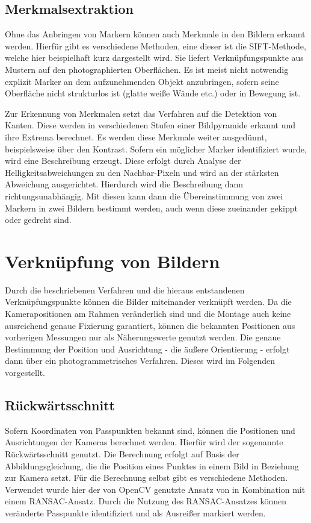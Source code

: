 \documentclass[./00PhotoBox.tex]{subfiles}
\begin{document}
\subsection{Merkmalsextraktion}
Ohne das Anbringen von Markern können auch Merkmale in den Bildern erkannt werden. Hierfür gibt es verschiedene Methoden, eine dieser ist die SIFT-Methode, welche hier beispielhaft kurz dargestellt wird. Sie liefert Verknüpfungspunkte aus Mustern auf den photographierten Oberflächen. Es ist meist nicht notwendig explizit Marker an dem aufzunehmenden Objekt anzubringen, sofern seine Oberfläche nicht strukturlos ist (glatte weiße Wände etc.) oder in Bewegung ist.

Zur Erkennung von Merkmalen setzt das Verfahren auf die Detektion von Kanten. Diese werden in verschiedenen Stufen einer Bildpyramide erkannt und ihre Extrema berechnet. Es werden diese Merkmale weiter ausgedünnt, beispielsweise über den Kontrast. Sofern ein möglicher Marker identifiziert wurde, wird eine Beschreibung erzeugt. Diese erfolgt  durch Analyse der Helligkeitsabweichungen zu den Nachbar-Pixeln und wird an der stärksten Abweichung ausgerichtet. Hierdurch wird die Beschreibung dann richtungsunabhängig. Mit diesen kann dann die Übereinstimmung von zwei Markern in zwei Bildern bestimmt werden, auch wenn diese zueinander gekippt oder gedreht sind.
\citep[S. 484f]{luhmann}

\section{Verknüpfung von Bildern}
\label{s:photogramm}
Durch die beschriebenen Verfahren und die hieraus entstandenen Verknüpfungs\-punkte können die Bilder miteinander verknüpft werden. Da die Kamerapositionen am Rahmen veränderlich sind und die Montage auch keine ausreichend genaue Fixierung garantiert, können die bekannten Positionen aus vorherigen Messungen nur als Näherungswerte genutzt werden. Die genaue Bestimmung der Position und Ausrichtung - die äußere Orientierung - erfolgt dann über ein photogrammetrisches Verfahren. Dieses wird im Folgenden vorgestellt.



\subsection{Rückwärtsschnitt}
Sofern Koordinaten von Passpunkten bekannt sind, können die Positionen und Ausrichtungen der Kameras berechnet werden. Hierfür wird der sogenannte Rückwärtsschnitt genutzt. Die Berechnung erfolgt auf Basis der Abbildungsgleichung, die die Position eines Punktes in einem Bild in Beziehung zur Kamera setzt. Für die Berechnung selbst gibt es verschiedene Methoden. Verwendet wurde hier der von OpenCV genutzte Ansatz von \citeauthor{Lepetit2008} in Kombination mit einem RANSAC-Ansatz. Durch die Nutzung des RANSAC-Ansatzes können veränderte Passpunkte identifiziert und als Ausreißer markiert werden.
\end{document}
